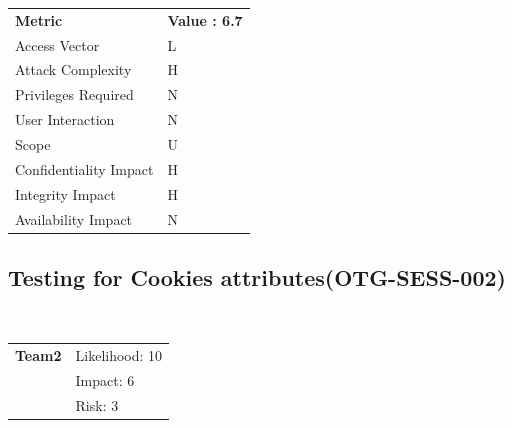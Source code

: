 \documentclass[headsepline,footsepline,footinclude=false,oneside,fontsize=11pt,paper=a4,listof=totoc,bibliography=totoc]{scrbook} %
\begin{document}
\begin{center}
	\begin{tabular}{ll}
		\rowcolor[HTML]{34CDF9}
		{\color[HTML]{ECF4FF} \textbf{Metric}}        & {\color[HTML]{ECF4FF} \textbf{Value : 6.7}} \\
		\rowcolor[HTML]{BBDAFF}
		{\color[HTML]{333333} Access Vector}          & {\color[HTML]{333333} } L              \\
		\rowcolor[HTML]{ECF4FF}
		{\color[HTML]{333333} Attack Complexity}      & {\color[HTML]{333333} } H              \\
		\rowcolor[HTML]{BBDAFF}
		{\color[HTML]{333333} Privileges Required}    & {\color[HTML]{333333} } N              \\
		\rowcolor[HTML]{ECF4FF}
		{\color[HTML]{333333} User Interaction}       & {\color[HTML]{333333} } N              \\
		\rowcolor[HTML]{BBDAFF}
		{\color[HTML]{333333} Scope}                  & {\color[HTML]{333333} } U 	              \\
		\rowcolor[HTML]{ECF4FF}
		{\color[HTML]{333333} Confidentiality Impact} & {\color[HTML]{333333} } H              \\
		\rowcolor[HTML]{BBDAFF}
		{\color[HTML]{333333} Integrity Impact}       & {\color[HTML]{333333} } H              \\
		\rowcolor[HTML]{ECF4FF}
		{\color[HTML]{333333} Availability Impact}    & {\color[HTML]{333333} } N
	\end{tabular}
\end{center}

\pagebreak
\subsection{Testing for Cookies attributes(OTG-SESS-002)}\

\begin{tabular}{cR{12cm}}
	\textbf{Team2} & Likelihood: 10\\& Impact: 6\\& Risk: 3
\end{tabular}
\end{document}
